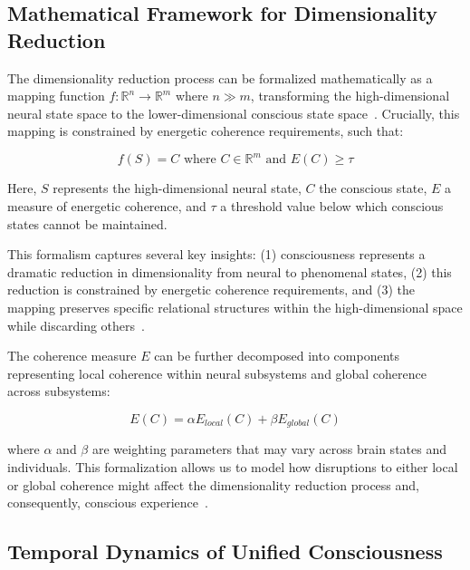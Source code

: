 \subsection*{Mathematical Framework for Dimensionality Reduction}

The dimensionality reduction process can be formalized mathematically as a mapping function $f: \mathbb{R}^n \rightarrow \mathbb{R}^m$ where $n \gg m$, transforming the high-dimensional neural state space to the lower-dimensional conscious state space~\cite{da2024mathematical,thompson2010mind}. Crucially, this mapping is constrained by energetic coherence requirements, such that:

\begin{equation}
    f(S) = C \text{ where } C \in \mathbb{R}^m \text{ and } E(C) \geq \tau
\end{equation}

Here, $S$ represents the high-dimensional neural state, $C$ the conscious state, $E$ a measure of energetic coherence, and $\tau$ a threshold value below which conscious states cannot be maintained.

This formalism captures several key insights: (1) consciousness represents a dramatic reduction in dimensionality from neural to phenomenal states, (2) this reduction is constrained by energetic coherence requirements, and (3) the mapping preserves specific relational structures within the high-dimensional space while discarding others~\cite{carhart2014entropic,bosl2025dynamical}.

The coherence measure $E$ can be further decomposed into components representing local coherence within neural subsystems and global coherence across subsystems:

\begin{equation}
    E(C) = \alpha E_{local}(C) + \beta E_{global}(C)
\end{equation}

where $\alpha$ and $\beta$ are weighting parameters that may vary across brain states and individuals. This formalization allows us to model how disruptions to either local or global coherence might affect the dimensionality reduction process and, consequently, conscious experience~\cite{breakspear2005dynamics,mashour2020conscious}.

\subsection*{Temporal Dynamics of Unified Consciousness}

